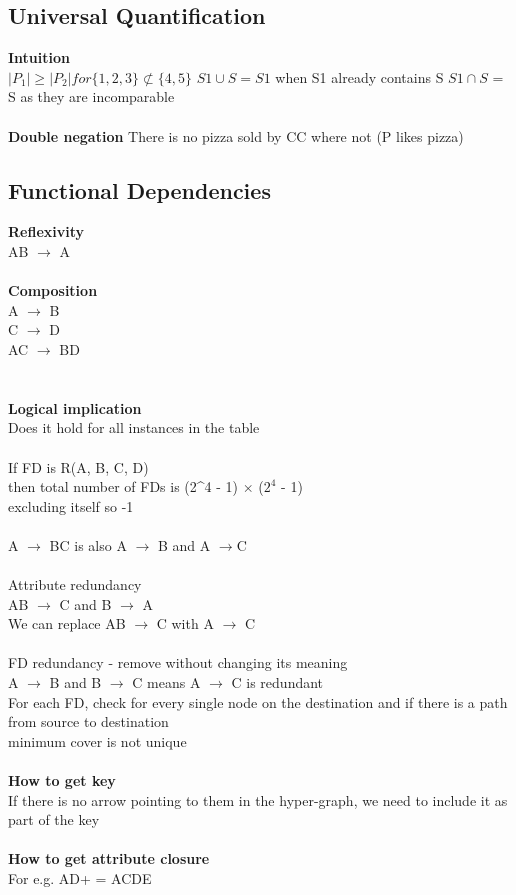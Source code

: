 \documentclass[11pt]{article}
\begin{document}
\subsection*{Universal Quantification}
\textbf{Intuition}
\\
$|P_{1}| \geq |P_{2}| for \{1, 2, 3\} \not\subset \{4, 5\}$
$S1 \cup S = S1$ when S1 already contains S
$S1 \cap S$ = S
as they are incomparable
\\\\
\textbf{Double negation}
There is no pizza sold by CC where not (P likes pizza) 
\subsection*{Functional Dependencies}
\textbf{Reflexivity}\\
AB $\rightarrow$ A 
\\\\
\textbf{Composition}\\
A $\rightarrow$ B \\
C $\rightarrow$ D \\
AC $\rightarrow$ BD \\
\\
\\
\textbf{Logical implication}\\
Does it hold for all instances in the table
\\\\
If FD is R(A, B, C, D)\\
then total number of FDs is (2^4 - 1) $\times$  ($2^4$ - 1)\\
excluding itself so -1\\
\\
A $\rightarrow$ BC is also A $\rightarrow$ B and A $\rightarrow $C
\\\\
Attribute redundancy\\
AB $\rightarrow$ C and B $\rightarrow$ A
\\
We can replace AB $\rightarrow$ C with A $\rightarrow$ C
\\
\\
FD redundancy - remove without changing its meaning\\
A $\rightarrow$ B and B $\rightarrow$ C means A $\rightarrow$ C is redundant\\
For each FD, check for every single node on the destination and if there is a path from source to destination
\\
minimum cover is not unique
\\
\\
\textbf{How to get key}\\
If there is no arrow pointing to them in the hyper-graph, we need to include it as part of the key\\
\\
\textbf{How to get attribute closure}\\
For e.g. AD+ = ACDE\\\\
\end{document}

